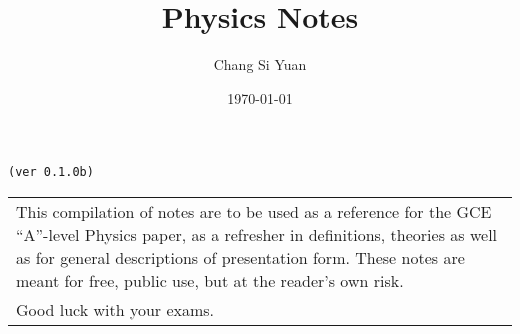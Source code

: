 \documentclass[../main]{subfiles}
\begin{document}
\author{Chang Si Yuan}
\title{Physics Notes}
\date{\today}

\maketitle

\begin{center}

	\texttt{(ver 0.1.0b)}

	\vspace{50pt}

	\begin{tabular}{>{\flushleft}p{8cm}}
	This compilation of notes are to be used as a reference for the GCE ``A''-level Physics paper, as a refresher in definitions, theories as well as for general descriptions of presentation form. These notes are meant for free, public use, but at the reader's own risk. \\
	Good luck with your exams.
	\end{tabular}

	\vspace{50pt}

\end{center}

\newpage
\end{document}
